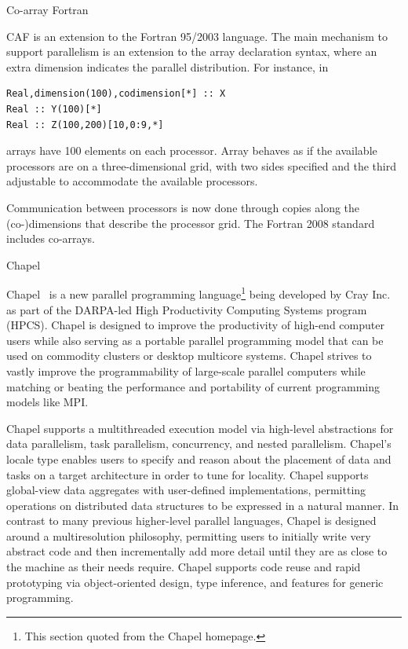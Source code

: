 
 {Co-array Fortran}

\acf{CAF} is an extension to the Fortran 95/2003 language.
The main mechanism to support parallelism is an extension to the array
declaration syntax, where an extra dimension indicates the parallel
distribution. For instance, in
\begin{verbatim}
Real,dimension(100),codimension[*] :: X
Real :: Y(100)[*]
Real :: Z(100,200)[10,0:9,*]
\end{verbatim}
arrays  have 100 elements on each processor.
Array  behaves as if the available processors
are on a three-dimensional grid, with two sides specified 
and the third adjustable to accommodate the available processors.

Communication between processors is now done through copies along the
(co-)dimensions that describe the processor grid.
The Fortran 2008 standard includes co-arrays.


 {Chapel}
\label{sec:Chapel}

Chapel~\cite{Chapel:homepage} is a new parallel programming
language\footnote{This section quoted from the Chapel homepage.}
being developed by Cray Inc. as part of the DARPA-led High
Productivity Computing Systems program (HPCS). Chapel is designed to
improve the productivity of high-end computer users while also serving
as a portable parallel programming model that can be used on commodity
clusters or desktop multicore systems. Chapel strives to vastly
improve the programmability of large-scale parallel computers while
matching or beating the performance and portability of current
programming models like MPI.

Chapel supports a multithreaded execution model via high-level
abstractions for data parallelism, task parallelism, concurrency, and
nested parallelism. Chapel's locale type enables users to specify and
reason about the placement of data and tasks on a target architecture
in order to tune for locality. Chapel supports global-view data
aggregates with user-defined implementations, permitting operations on
distributed data structures to be expressed in a natural manner. In
contrast to many previous higher-level parallel languages, Chapel is
designed around a multiresolution philosophy, permitting users to
initially write very abstract code and then incrementally add more
detail until they are as close to the machine as their needs
require. Chapel supports code reuse and rapid prototyping via
object-oriented design, type inference, and features for generic
programming.

